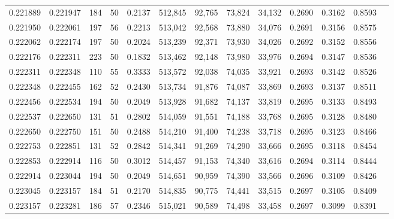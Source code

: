 \begin{tabular}{rrrrrrrrrrrrr}
0.221889 & 0.221947 &   184 &  50 &                                     0.2137 & 512,845 &  92,765 &  73,824 &  34,132 & 0.2690 & 0.3162 & 0.8593 \\
0.221950 & 0.222061 &   197 &  56 &                                     0.2213 & 513,042 &  92,568 &  73,880 &  34,076 & 0.2691 & 0.3156 & 0.8575 \\
0.222062 & 0.222174 &   197 &  50 &                                     0.2024 & 513,239 &  92,371 &  73,930 &  34,026 & 0.2692 & 0.3152 & 0.8556 \\
0.222176 & 0.222311 &   223 &  50 &                                     0.1832 & 513,462 &  92,148 &  73,980 &  33,976 & 0.2694 & 0.3147 & 0.8536 \\
0.222311 & 0.222348 &   110 &  55 &                                     0.3333 & 513,572 &  92,038 &  74,035 &  33,921 & 0.2693 & 0.3142 & 0.8526 \\
0.222348 & 0.222455 &   162 &  52 &                                     0.2430 & 513,734 &  91,876 &  74,087 &  33,869 & 0.2693 & 0.3137 & 0.8511 \\
0.222456 & 0.222534 &   194 &  50 &                                     0.2049 & 513,928 &  91,682 &  74,137 &  33,819 & 0.2695 & 0.3133 & 0.8493 \\
0.222537 & 0.222650 &   131 &  51 &                                     0.2802 & 514,059 &  91,551 &  74,188 &  33,768 & 0.2695 & 0.3128 & 0.8480 \\
0.222650 & 0.222750 &   151 &  50 &                                     0.2488 & 514,210 &  91,400 &  74,238 &  33,718 & 0.2695 & 0.3123 & 0.8466 \\
0.222753 & 0.222851 &   131 &  52 &                                     0.2842 & 514,341 &  91,269 &  74,290 &  33,666 & 0.2695 & 0.3118 & 0.8454 \\
0.222853 & 0.222914 &   116 &  50 &                                     0.3012 & 514,457 &  91,153 &  74,340 &  33,616 & 0.2694 & 0.3114 & 0.8444 \\
0.222914 & 0.223044 &   194 &  50 &                                     0.2049 & 514,651 &  90,959 &  74,390 &  33,566 & 0.2696 & 0.3109 & 0.8426 \\
0.223045 & 0.223157 &   184 &  51 &                                     0.2170 & 514,835 &  90,775 &  74,441 &  33,515 & 0.2697 & 0.3105 & 0.8409 \\
0.223157 & 0.223281 &   186 &  57 &                                     0.2346 & 515,021 &  90,589 &  74,498 &  33,458 & 0.2697 & 0.3099 & 0.8391 \\

\end{tabular}
